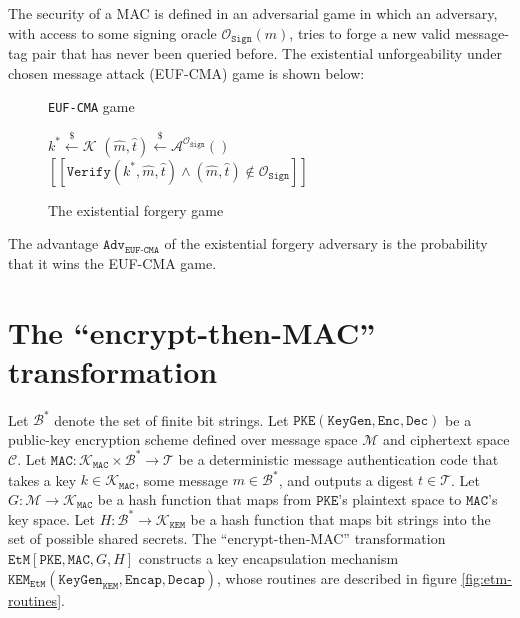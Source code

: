 \documentclass[journal=tches,submission]{iacrtrans}
\newcommand{\pke}{\texttt{PKE}}
\newcommand{\keygen}{\texttt{KeyGen}}
\newcommand{\encrypt}{\texttt{Enc}}
\newcommand{\decrypt}{\texttt{Dec}}
\newcommand{\kem}{\texttt{KEM}}
\newcommand{\encap}{\texttt{Encap}}
\newcommand{\decap}{\texttt{Decap}}
\newcommand{\etm}{\texttt{EtM}}  %
\newcommand{\mac}{\texttt{MAC}}
\newcommand{\sign}{\texttt{Sign}}
\newcommand{\verify}{\texttt{Verify}}
\newcommand{\leftsample}{\stackrel{\$}{\leftarrow}}
\newcommand{\llbrack}{[\![}
\newcommand{\rrbrack}{]\!]}
\newcommand{\adv}{\texttt{Adv}}
\begin{document}
The security of a MAC is defined in an adversarial game in which an adversary, with access to some signing oracle $\mathcal{O}_\sign(m)$, tries to forge a new valid message-tag pair that has never been queried before. The existential unforgeability under chosen message attack (EUF-CMA) game is shown below:

\begin{figure}[H]
    \centering
    \begin{minipage}{0.7\textwidth}
        \begin{algorithm}[H]
            \caption*{\texttt{EUF-CMA} game}

            \begin{algorithmic}[1]
                \State $k^\ast \leftsample \mathcal{K}$
                \State $(\hat{m}, \hat{t}) \leftsample \mathcal{A}^{\mathcal{O}_\sign}()$
                \State \Return $
                    \llbrack \verify(k^\ast, \hat{m}, \hat{t}) 
                    \land (\hat{m}, \hat{t}) \not\in \mathcal{O}_\sign
                    \rrbrack
                $
            \end{algorithmic}
        \end{algorithm}
    \end{minipage}
    \caption{The existential forgery game}\label{fig:euf-cma-game}
\end{figure}

The advantage $\adv_\texttt{EUF-CMA}$ of the existential forgery adversary is the probability that it wins the EUF-CMA game.

\section{The ``encrypt-then-MAC'' transformation}\label{sec:main-results}
Let $\mathcal{B}^\ast$ denote the set of finite bit strings. Let $\pke(\keygen, \encrypt, \decrypt)$ be a public-key encryption scheme defined over message space $\mathcal{M}$ and ciphertext space $\mathcal{C}$. Let $\mac: \mathcal{K}_\mac \times \mathcal{B}^\ast \rightarrow \mathcal{T}$ be a deterministic message authentication code that takes a key $k \in \mathcal{K}_\mac$, some message $m \in \mathcal{B}^\ast$, and outputs a digest $t \in \mathcal{T}$. Let $G: \mathcal{M} \rightarrow \mathcal{K}_\mac$ be a hash function that maps from $\pke$'s plaintext space to $\mac$'s key space. Let $H: \mathcal{B}^\ast \rightarrow \mathcal{K}_\kem$ be a hash function that maps bit strings into the set of possible shared secrets. The ``encrypt-then-MAC'' transformation $\etm[\pke, \mac, G, H]$ constructs a key encapsulation mechanism $\kem_\etm(\keygen_\kem, \encap, \decap)$, whose routines are described in figure \ref{fig:etm-routines}.
\end{document}
